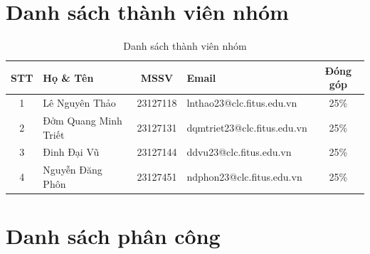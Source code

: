 \newpage
\section*{Danh sách thành viên nhóm}

\begin{table}[h!]
    \centering
    \small
    \renewcommand{\arraystretch}{1.5}
    \begin{tabularx}{\textwidth}{|c|l|c|X|c|}
        \hline
        \textbf{STT} & \textbf{Họ \& Tên} & \textbf{MSSV} & \textbf{Email} & \textbf{Đóng góp} \\ \hline
        1 & Lê Nguyên Thảo & 23127118 & lnthao23@clc.fitus.edu.vn & 25\% \\ \hline
        2 & Đởm Quang Minh Triết & 23127131 & dqmtriet23@clc.fitus.edu.vn & 25\% \\ \hline
        3 & Đinh Đại Vũ & 23127144 & ddvu23@clc.fitus.edu.vn & 25\% \\ \hline
        4 & Nguyễn Đăng Phôn & 23127451 & ndphon23@clc.fitus.edu.vn & 25\% \\ \hline
    \end{tabularx}
    \caption{Danh sách thành viên nhóm}
\end{table}

\vspace{1cm}
\section*{Danh sách phân công}

